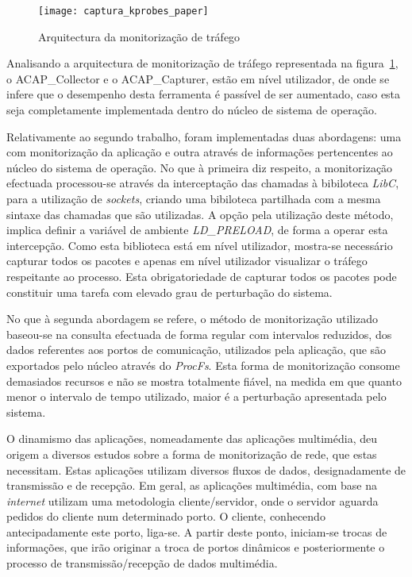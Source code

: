 \begin{figure}[h!]
       \centering
       \texttt{[image: captura\_kprobes\_paper]}
       \caption{Arquitectura da monitorização de tráfego}
	\label{fig:paper_capture_kprobes}
\end{figure}


Analisando a arquitectura de monitorização de tráfego representada na figura~\ref{fig:paper_capture_kprobes}, o ACAP\_Collector e o ACAP\_Capturer, estão em nível utilizador, de onde se infere que o desempenho desta ferramenta é passível de ser aumentado, caso esta seja completamente implementada dentro do núcleo de sistema de operação.

Relativamente ao segundo trabalho, foram implementadas duas abordagens: uma com monitorização da aplicação e outra através de informações pertencentes ao núcleo do sistema de operação.
No que à primeira diz respeito, a monitorização efectuada processou-se através da interceptação das chamadas à bibiloteca \textit{LibC}, para a utilização de \textit{sockets}, criando uma bibiloteca partilhada com a mesma sintaxe das chamadas que são utilizadas.
A opção pela utilização deste método, implica definir a variável de ambiente \textit{LD\_PRELOAD}, de forma a operar esta intercepção.
Como esta biblioteca está em nível utilizador, mostra-se necessário capturar todos os pacotes e apenas em nível utilizador visualizar o tráfego respeitante ao processo.
Esta obrigatoriedade de capturar todos os pacotes pode constituir uma tarefa com elevado grau de perturbação do sistema.

No que à segunda abordagem se refere, o método de monitorização utilizado baseou-se na consulta efectuada de forma regular com intervalos reduzidos, dos dados referentes aos portos de comunicação, utilizados pela aplicação, que são exportados pelo núcleo através do \textit{ProcFs}.
Esta forma de monitorização consome demasiados recursos e não se mostra totalmente fiável, na medida em que quanto menor o intervalo de tempo utilizado, maior é a perturbação apresentada pelo sistema.

O dinamismo das aplicações, nomeadamente das aplicações multimédia, deu origem a diversos estudos sobre a forma de monitorização de rede, que estas necessitam.
Estas aplicações utilizam diversos fluxos de dados, designadamente de transmissão e de recepção.
Em geral, as aplicações multimédia, com base na \textit{internet} utilizam uma metodologia cliente/servidor, onde o servidor aguarda pedidos do cliente num determinado porto.
O cliente, conhecendo antecipadamente este porto, liga-se.
A partir deste ponto, iniciam-se trocas de informações, que irão originar a troca de portos dinâmicos e posteriormente o processo de transmissão/recepção de dados multimédia.

